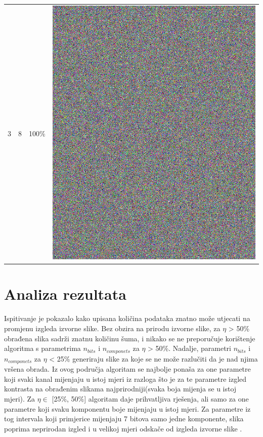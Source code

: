 \documentclass[times, utf8, seminar, numeric]{fer}
\begin{document}
\begin{center}
\begin{longtable}{|c|c|c|c|}
3 & 8 &100\% & \includegraphics[scale=0.3]{../benchmark_results/pattern/3_components-8_bits.png} \\
\end{longtable}
\end{center}

\section{Analiza rezultata}
\paragraph{}
Ispitivanje je pokazalo kako upisana količina podataka znatno može utjecati na promjenu izgleda izvorne slike. Bez obzira na prirodu izvorne slike, za $\eta$ > 50\% obrađena slika sadrži znatnu količinu šuma, i nikako se ne preporučuje korištenje algoritma s parametrima $n_{bits}$ i $n_{componets}$ za $\eta$ > 50\%. Nadalje, parametri $n_{bits}$ i $n_{componets}$ za $\eta$ < 25\% generiraju slike za koje se ne može razlučiti da je nad njima vršena obrada. Iz ovog područja algoritam se najbolje ponaša za one parametre koji svaki kanal mijenjaju u istoj mjeri iz razloga što je za te parametre izgled kontrasta na obrađenim slikama najprirodniji(svaka boja mijenja se u istoj mjeri). Za $\eta \in$ [25\%, 50\%] algoritam daje prihvatljiva rješenja, ali samo za one parametre koji svaku komponentu boje mijenjaju u istoj mjeri. Za parametre iz tog intervala koji primjerice mijenjaju 7 bitova samo jedne komponente, slika poprima neprirodan izgled i u velikoj mjeri odskače od izgleda izvorne slike \cite{steg_bench}.
\end{document}
